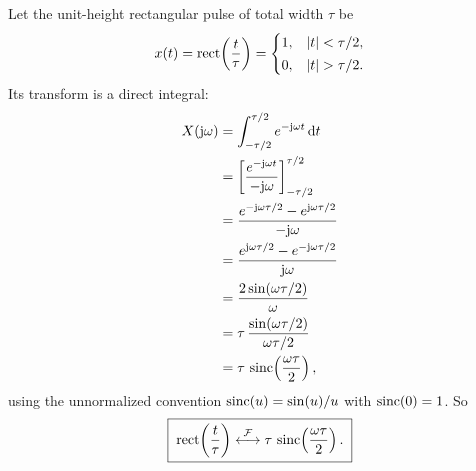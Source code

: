 Let the unit-height rectangular pulse of total width $\tau$ be
\begin{equation}
x(t) = \operatorname{rect}\!\left(\frac{t}{\tau}\right) =
\begin{cases} 1, & \lvert t\rvert < \tau/2,\\[2pt] 0, & \lvert t\rvert > \tau/2. \end{cases}
\end{equation}
Its transform is a direct integral:
\begin{align}
X(\mathrm{j}\omega) &= \int_{-\tau/2}^{\tau/2} e^{-\mathrm{j}\omega t}\, \mathrm{d} t \notag \\
&= \left[\frac{e^{-\mathrm{j}\omega t}}{-\mathrm{j}\omega}\right]_{-\tau/2}^{\tau/2} \notag \\
&= \frac{e^{-\mathrm{j}\omega\tau/2} - e^{\mathrm{j}\omega\tau/2}}{-\mathrm{j}\omega} \notag \\
&= \frac{e^{\mathrm{j}\omega\tau/2} - e^{-\mathrm{j}\omega\tau/2}}{\mathrm{j}\omega} \notag \\
&= \frac{2\sin(\omega\tau/2)}{\omega} \notag \\
&= \tau\,\frac{\sin(\omega\tau/2)}{\omega\tau/2} \notag \\
&= \tau\,\operatorname{sinc}\!\left(\frac{\omega\tau}{2}\right),
\label{ch07:rect-result}
\end{align}
using the unnormalized convention $\operatorname{sinc}(u) = \sin(u)/u$ with $\operatorname{sinc}(0)=1$. So
\begin{equation}
\boxed{\;\operatorname{rect}\!\left(\frac{t}{\tau}\right) \overset{\mathcal{F}}{\longleftrightarrow}
\tau\,\operatorname{sinc}\!\left(\frac{\omega\tau}{2}\right).\;}
\end{equation}

